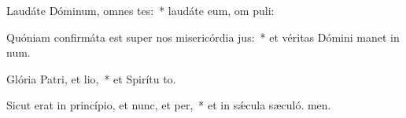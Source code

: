 \item Laudáte Dóminum, omnes tes:~* laudáte eum, om puli:
\item Quóniam confirmáta est super nos misericórdia jus:~* et véritas Dómini manet in num.
\item Glória Patri, et lio,~* et Spirítu to.
\item Sicut erat in princípio, et nunc, et per,~* et in sǽcula sæculó. men.
